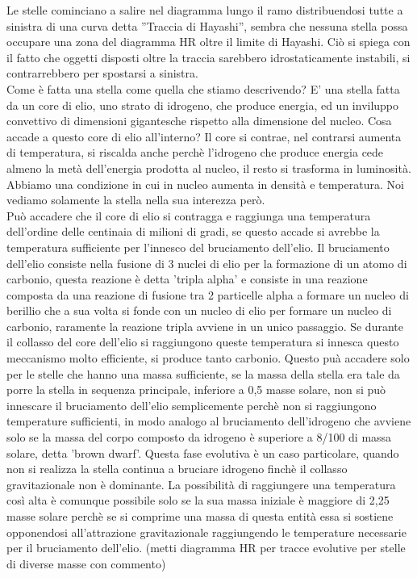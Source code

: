 \documentclass[a4paper,11pt]{article}
\begin{document}
    Le stelle cominciano a salire nel diagramma lungo il ramo distribuendosi tutte a sinistra di una curva detta ''Traccia di Hayashi'', sembra che nessuna stella possa occupare una zona del diagramma HR oltre il limite di Hayashi. Ciò si spiega con il fatto che oggetti disposti oltre la traccia sarebbero idrostaticamente instabili, si contrarrebbero per spostarsi a sinistra.\\
    Come è fatta una stella come quella che stiamo descrivendo? E' una stella fatta da un core di elio, uno strato di idrogeno, che produce energia, ed un inviluppo convettivo di dimensioni gigantesche rispetto alla dimensione del nucleo. Cosa accade a questo core di elio all'interno? Il core si contrae, nel contrarsi aumenta di temperatura, si riscalda anche perchè l'idrogeno che produce energia cede almeno la metà dell'energia prodotta al nucleo, il resto si trasforma in luminosità. Abbiamo una condizione in cui in nucleo aumenta in densità e temperatura. Noi vediamo solamente la stella nella sua interezza però.\\
    Può accadere che il core di elio si contragga e raggiunga una temperatura dell'ordine delle centinaia di milioni di gradi, se questo accade si avrebbe la temperatura sufficiente per l'innesco del bruciamento dell'elio. Il bruciamento dell'elio consiste nella fusione di 3 nuclei di elio per la formazione di un atomo di carbonio, questa reazione è detta 'tripla alpha' e consiste in una reazione composta da una reazione di fusione tra 2 particelle alpha a formare un nucleo di berillio che a sua volta si fonde con un nucleo di elio per formare un nucleo di carbonio, raramente la reazione tripla avviene in un unico passaggio. Se durante il collasso del core dell'elio si raggiungono queste temperatura si innesca questo meccanismo molto efficiente, si produce tanto carbonio. Questo puà accadere solo per le stelle che hanno una massa sufficiente, se la massa della stella era tale da porre la stella in sequenza principale, inferiore a 0,5 masse solare, non si può innescare il bruciamento dell'elio semplicemente perchè non si raggiungono temperature sufficienti, in modo analogo al bruciamento dell'idrogeno che avviene solo se la massa del corpo composto da idrogeno è superiore a 8/100 di massa solare, detta 'brown dwarf'. Questa fase evolutiva è un caso particolare, quando non si realizza la stella continua a bruciare idrogeno finchè il collasso gravitazionale non è dominante. La possibilità di raggiungere una temperatura così alta è comunque possibile solo se la sua massa iniziale è maggiore di 2,25 masse solare perchè se si comprime una massa di questa entità essa si sostiene opponendosi all'attrazione gravitazionale raggiungendo le temperature necessarie per il bruciamento dell'elio. (metti diagramma HR per tracce evolutive per stelle di diverse masse con commento)\\
\end{document}
